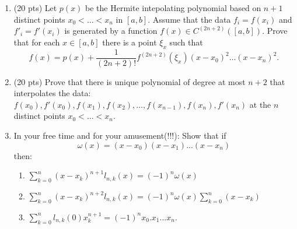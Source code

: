 \begin{enumerate}
\bigskip
\item (20 pts) Let  $p(x)$ be the Hermite intepolating polynomial based on
$n+1$ distinct points $x_0 < \dots < x_n$ in $[a,b]$. Assume that the data 
$f_i=f(x_i)$ and $f'_i=f'(x_i)$ is generated by a function 
$f(x) \in C^{(2n+2)}([a,b])$. Prove that for each $x \in [a,b]$ there is a point $\xi_x$ such that
$$
f(x)= p(x)+ \frac{1}{(2n+2)!}f^{(2n+2)}(\xi_x) (x-x_0)^2 \dots (x-x_n)^2.
$$

\bigskip
\item (20 pts) Prove that there is unique polynomial of degree at most $n+2$ that interpolates the data:
$f(x_0), f'(x_0), f(x_1), f(x_2), \dots, f(x_{n-1}), f(x_n), f'(x_n)$ at the $n$ distinct points
$x_0< \dots < x_n$.

\bigskip
\item In your free time and for your amusement(!!!):
 Show that if 
$$\omega (x)=(x-x_0)(x-x_1)...(x-x_n)$$ 
then:
\begin{enumerate}
\item  $\sum_{k=0}^{n}(x-x_k)^{n+1} l_{n,k} (x) = (-1)^n \omega (x)$ 
\item  $\sum_{k=0}^{n}(x-x_k)^{n+2} l_{n,k} (x) = 
(-1)^n \omega (x) \sum_{k=0}^{n} (x-x_k)$ 
\item  $ \sum_{k=0}^{n} l_{n,k} (0) x_k^{n+1}=(-1)^n x_0.x_1...x_n$.
\end{enumerate}

\end{enumerate}





\begin{comment}
\bigskip
\item (20 pts) Let 
$$L_{n,k}(x)= \displaystyle
\frac{(x-x_0)...(x-x_{k-1})(x-x_{k+1})...(x-x_n)}
{(x_k-x_0)...(x_k-x_{k-1})(x_k-x_{k+1})...(x_k-x_n)}. 
$$ 
Show that for any $x$ the following relations are valid:
\begin{enumerate}
\item $\sum_{k=0}^{n} L_{n,k} (x) = 1$;
\item $\sum_{k=0}^{n}x_k^m  L_{n,k} (x) = x^m$ for $m=1,...,n$.
\end{enumerate}

\end{comment}
